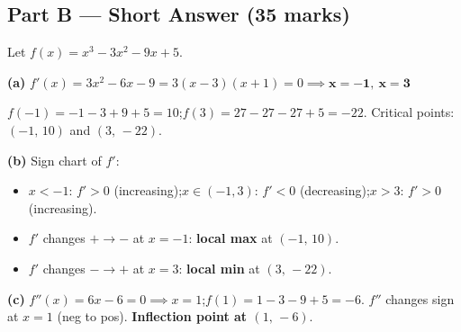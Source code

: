 \documentclass[addpoints]{exam}
\begin{document}
\begin{questions}
\section*{Part B --- Short Answer (35 marks)}

\question Let $f(x) = x^3 - 3x^2 - 9x + 5$.
\begin{solution}[11cm]
\textbf{(a)} $f'(x) = 3x^2 - 6x - 9 = 3(x-3)(x+1) = 0 \implies \mathbf{x = -1,\ x = 3}$

$f(-1) = -1 - 3 + 9 + 5 = 10$;\quad $f(3) = 27 - 27 - 27 + 5 = -22$.
Critical points: $(-1,\,10)$ and $(3,\,-22)$.

\textbf{(b)} Sign chart of $f'$:
\begin{itemize}
    \item $x < -1$: $f' > 0$ (increasing);\quad $x \in (-1,3)$: $f' < 0$ (decreasing);\quad $x > 3$: $f' > 0$ (increasing).
    \item $f'$ changes $+\to-$ at $x=-1$: \textbf{local max} at $(-1,\,10)$.
    \item $f'$ changes $-\to+$ at $x=3$: \textbf{local min} at $(3,\,-22)$.
\end{itemize}

\textbf{(c)} $f''(x) = 6x - 6 = 0 \implies x = 1$;\quad $f(1) = 1-3-9+5 = -6$.
$f''$ changes sign at $x=1$ (neg to pos). \textbf{Inflection point at $(1,\,-6)$}.


\end{solution}
\end{questions}
\end{document}

